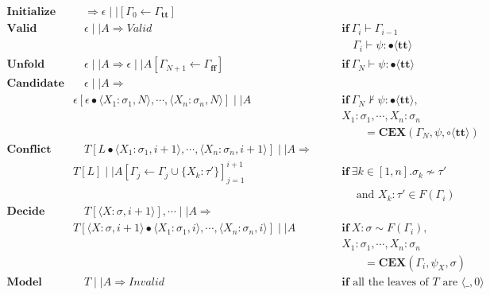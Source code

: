 \documentclass[runningheads]{llncs}
\newcommand\COL{\mathbin{:}}
\newcommand \true {\textbf{tt}}
\newcommand \false {\textbf{ff}}
\newcommand \stypebool {\bullet}
\newcommand \stypeboolf {\circ}
\newcommand \typebool[1]{\stypebool \langle #1 \rangle}
\newcommand \typeboolf[1]{\stypeboolf \langle #1 \rangle}
\newcommand {\conflict}{\not \sim}
\newcommand {\consistent}{\sim}
\begin{document}
\begin{align*}
    \textbf{Initialize} &\quad
        \Longrightarrow
        \epsilon \mid \mid [\Gamma_0 \leftarrow \Gamma_\true]
        &&\\
    \textbf{Valid} &\quad
        \epsilon \mid \mid A \Longrightarrow \textit{Valid}
        &&\quad \textbf{if} \ \Gamma_{i} \vdash \Gamma_{i-1} \\
        &&&\quad \quad \Gamma_i \vdash \psi \COL \typebool{\true}
        \\
    \textbf{Unfold} &\quad
        \epsilon \mid \mid A \Longrightarrow
        \epsilon \mid \mid A[\Gamma_{N+1} \leftarrow \Gamma_\false]
        &&\quad \textbf{if} \ \Gamma_{N} \vdash \psi \COL \typebool{\true}
        \\
    \textbf{Candidate} &\quad
        \epsilon \mid \mid A
        \Longrightarrow&&\\
        & \epsilon[\epsilon \bullet \langle X_1 \COL \sigma_1, N \rangle, \cdots, \langle X_n \COL \sigma_n, N \rangle]\mid \mid A
        && \quad \textbf{if} \ \Gamma_N \not \vdash \psi \COL
        \typebool{\true},\\
        &&&\quad  X_1 \COL \sigma_1 , \cdots, X_n \COL \sigma_n\\
        &&&\quad \quad \quad=\textbf{CEX}(\Gamma_N, \psi, \typeboolf{\true})
        \\
    \textbf{Conflict} &\quad
        T[L \bullet \langle X_1: \sigma_1, i + 1 \rangle, \cdots,
                     \langle X_n: \sigma_n, i + 1 \rangle
        ] \mid \mid A
        \Longrightarrow&&\\
        & T[L]
        \mid \mid A[\Gamma_j \leftarrow \Gamma_j \cup \{X_k: \tau'\}]_{j=1}^{i+1}
        &&\quad \textbf{if} \  \exists k \in [1, n].
        \sigma_k \conflict \tau' \\
        &&&\quad \quad \text{ and } X_k \COL \tau' \in F(\Gamma_i)
        \\
    \textbf{Decide} &\quad
         T[\langle X: \sigma, i + 1 \rangle], \cdots\mid \mid A
        \Longrightarrow&&\\
        &  T[\langle X: \sigma, i + 1 \rangle
                \bullet \langle X_1 \COL \sigma_1, i\rangle, \cdots,
                        \langle X_n \COL \sigma_n, i\rangle]
        \mid \mid A
        &&\quad \textbf{if} \ X \COL \sigma \consistent F(\Gamma_i),\\
        &&&\quad  X_1 \COL \sigma_1, \cdots, X_n \COL \sigma_n\\
        &&&\quad\quad\quad= \textbf{CEX}(\Gamma_i, \psi_X, \sigma)
        \\
    \textbf{Model} &\quad
        T \mid \mid A \Rightarrow Invalid
        &&\quad \textbf{if} \text{ all the leaves of } T \text{ are } \langle \_, 0 \rangle \
        \\
\end{align*}
\end{document}

